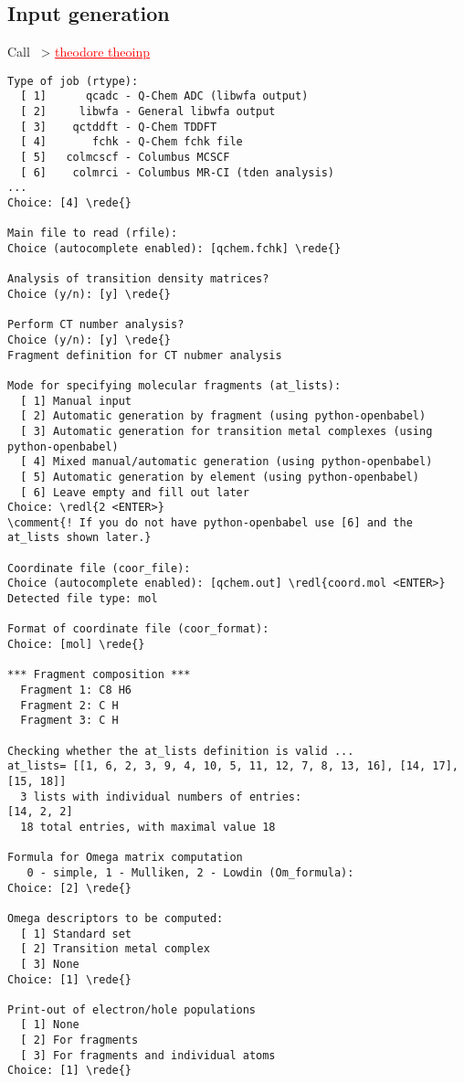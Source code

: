 \documentclass[DIV=12,headings=normal]{scrartcl}
\newcommand{\comment}[1]{\textcolor{blue}{#1}}
\newcommand{\redl}[1]{{\textcolor{red}{\underline{#1}}}}
\newcommand{\rede}[1]{\redl{#1 <ENTER>}}
\newcommand{\comm}[1]{
\small
~> \redl{#1}
\normalsize
}
\newcounter{number}
\begin{document}
\clearpage
\subsection{Input generation}
Call \comm{theodore theoinp}
\scriptsize
\begin{Verbatim}[commandchars=\\\{\}]
Type of job (rtype):
  [ 1]      qcadc - Q-Chem ADC (libwfa output)
  [ 2]     libwfa - General libwfa output
  [ 3]    qctddft - Q-Chem TDDFT
  [ 4]       fchk - Q-Chem fchk file
  [ 5]   colmcscf - Columbus MCSCF
  [ 6]    colmrci - Columbus MR-CI (tden analysis)
...
Choice: [4] \rede{}

Main file to read (rfile):
Choice (autocomplete enabled): [qchem.fchk] \rede{}

Analysis of transition density matrices?
Choice (y/n): [y] \rede{}

Perform CT number analysis?
Choice (y/n): [y] \rede{}
Fragment definition for CT nubmer analysis

Mode for specifying molecular fragments (at_lists):
  [ 1] Manual input
  [ 2] Automatic generation by fragment (using python-openbabel)
  [ 3] Automatic generation for transition metal complexes (using python-openbabel)
  [ 4] Mixed manual/automatic generation (using python-openbabel)
  [ 5] Automatic generation by element (using python-openbabel)
  [ 6] Leave empty and fill out later
Choice: \redl{2 <ENTER>}
\comment{! If you do not have python-openbabel use [6] and the at_lists shown later.}

Coordinate file (coor_file):
Choice (autocomplete enabled): [qchem.out] \redl{coord.mol <ENTER>} 
Detected file type: mol

Format of coordinate file (coor_format):
Choice: [mol] \rede{} 

*** Fragment composition ***
  Fragment 1: C8 H6 
  Fragment 2: C H 
  Fragment 3: C H 

Checking whether the at_lists definition is valid ...
at_lists= [[1, 6, 2, 3, 9, 4, 10, 5, 11, 12, 7, 8, 13, 16], [14, 17], [15, 18]]
  3 lists with individual numbers of entries:
[14, 2, 2]
  18 total entries, with maximal value 18

Formula for Omega matrix computation
   0 - simple, 1 - Mulliken, 2 - Lowdin (Om_formula):
Choice: [2] \rede{}

Omega descriptors to be computed:
  [ 1] Standard set
  [ 2] Transition metal complex
  [ 3] None
Choice: [1] \rede{}

Print-out of electron/hole populations
  [ 1] None
  [ 2] For fragments
  [ 3] For fragments and individual atoms
Choice: [1] \rede{}


\end{Verbatim}
\end{document}

